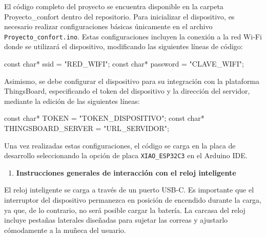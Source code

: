 \documentclass[
  12pt,
  letterpaper,
  DIV=11,
  numbers=noendperiod]{scrreport}
\newenvironment{Shaded}{\begin{snugshade}}{\end{snugshade}}
\newcommand{\AttributeTok}[1]{\textcolor[rgb]{0.40,0.45,0.13}{#1}}
\newcommand{\DataTypeTok}[1]{\textcolor[rgb]{0.68,0.00,0.00}{#1}}
\newcommand{\NormalTok}[1]{\textcolor[rgb]{0.00,0.23,0.31}{#1}}
\newcommand{\OperatorTok}[1]{\textcolor[rgb]{0.37,0.37,0.37}{#1}}
\newcommand{\StringTok}[1]{\textcolor[rgb]{0.13,0.47,0.30}{#1}}
\providecommand{\tightlist}{%
  \setlength{\itemsep}{0pt}\setlength{\parskip}{0pt}}\usepackage{longtable,booktabs,array}
\begin{document}
El código completo del proyecto se encuentra disponible en la carpeta
Proyecto\_confort dentro del repositorio. Para inicializar el
dispositivo, es necesario realizar configuraciones básicas únicamente en
el archivo \texttt{Proyecto\_confort.ino}. Estas configuraciones
incluyen la conexión a la red Wi-Fi donde se utilizará el dispositivo,
modificando las siguientes líneas de código:

\begin{Shaded}
\begin{Highlighting}[]
\AttributeTok{const} \DataTypeTok{char}\OperatorTok{*}\NormalTok{ ssid }\OperatorTok{=} \StringTok{"RED\_WIFI"}\OperatorTok{;}
\AttributeTok{const} \DataTypeTok{char}\OperatorTok{*}\NormalTok{ password }\OperatorTok{=} \StringTok{"CLAVE\_WIFI"}\OperatorTok{;}
\end{Highlighting}
\end{Shaded}

Asimismo, se debe configurar el dispositivo para su integración con la
plataforma ThingsBoard, especificando el token del dispositivo y la
dirección del servidor, mediante la edición de las siguientes líneas:

\begin{Shaded}
\begin{Highlighting}[]
\AttributeTok{const} \DataTypeTok{char}\OperatorTok{*}\NormalTok{ TOKEN }\OperatorTok{=} \StringTok{"TOKEN\_DISPOSITIVO"}\OperatorTok{;}
\AttributeTok{const} \DataTypeTok{char}\OperatorTok{*}\NormalTok{ THINGSBOARD\_SERVER }\OperatorTok{=} \StringTok{"URL\_SERVIDOR"}\OperatorTok{;}
\end{Highlighting}
\end{Shaded}

Una vez realizadas estas configuraciones, el código se carga en la placa
de desarrollo seleccionando la opción de placa \texttt{XIAO\_ESP32C3} en
el Arduino IDE.

\begin{enumerate}
\def\labelenumi{\arabic{enumi}.}
\setcounter{enumi}{3}
\tightlist
\item
  \textbf{Instrucciones generales de interacción con el reloj
  inteligente}
\end{enumerate}

El reloj inteligente se carga a través de un puerto USB-C. Es importante
que el interruptor del dispositivo permanezca en posición de encendido
durante la carga, ya que, de lo contrario, no será posible cargar la
batería. La carcasa del reloj incluye pestañas laterales diseñadas para
sujetar las correas y ajustarlo cómodamente a la muñeca del usuario.
\end{document}
